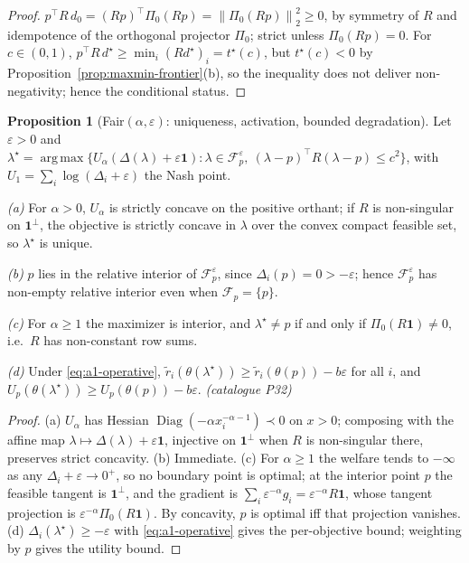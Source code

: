 \documentclass[12pt,a4paper]{report}
\newcommand{\1}{\mathbf{1}}
\newcommand{\norm}[1]{\left\lVert #1 \right\rVert}
\newcommand{\Floor}{\mathcal{F}_{p}}
\newcommand{\Pz}{\Pi_{0}}
\DeclareMathOperator*{\argmax}{arg\,max}
\DeclareMathOperator{\Diag}{Diag}
\theoremstyle{definition}
\newtheorem{proposition}[definition]{Proposition}
\begin{document}
\begin{proof}
\(p^\top R\,d_0=(Rp)^\top\Pz(Rp)=\norm{\Pz(Rp)}_2^2\ge0\), by symmetry of \(R\) and idempotence of the orthogonal projector \(\Pz\); strict unless \(\Pz(Rp)=0\). For \(c\in(0,1)\), \(p^\top R\,d^\star\ge\min_i(Rd^\star)_i=t^\star(c)\), but \(t^\star(c)<0\) by Proposition~\ref{prop:maxmin-frontier}(b), so the inequality does not deliver non-negativity; hence the conditional status.
\end{proof}

\begin{proposition}[Fair\((\alpha,\varepsilon)\): uniqueness, activation, bounded degradation]
\label{prop:fair}
Let \(\varepsilon>0\) and \(\lambda^\star=\argmax\{U_\alpha(\Delta(\lambda)+\varepsilon\1):\lambda\in\Floor^\varepsilon,\ (\lambda-p)^\top R(\lambda-p)\le c^2\}\), with \(U_1=\sum_i\log(\Delta_i+\varepsilon)\) the Nash point.

\emph{(a)} For \(\alpha>0\), \(U_\alpha\) is strictly concave on the positive orthant; if \(R\) is non-singular on \(\1^\perp\), the objective is strictly concave in \(\lambda\) over the convex compact feasible set, so \(\lambda^\star\) is unique.

\emph{(b)} \(p\) lies in the relative interior of \(\Floor^\varepsilon\), since \(\Delta_i(p)=0>-\varepsilon\); hence \(\Floor^\varepsilon\) has non-empty relative interior even when \(\Floor=\{p\}\).

\emph{(c)} For \(\alpha\ge1\) the maximizer is interior, and \(\lambda^\star\ne p\) if and only if \(\Pz(R\1)\ne0\), i.e.\ \(R\) has non-constant row sums.

\emph{(d)} Under \eqref{eq:a1-operative}, \(\tilde r_i(\theta(\lambda^\star))\ge\tilde r_i(\theta(p))-b\varepsilon\) for all \(i\), and \(U_p(\theta(\lambda^\star))\ge U_p(\theta(p))-b\varepsilon\). \emph{(catalogue P32)}
\end{proposition}

\begin{proof}
(a) \(U_\alpha\) has Hessian \(\Diag(-\alpha x_i^{-\alpha-1})\prec0\) on \(x>0\); composing with the affine map \(\lambda\mapsto\Delta(\lambda)+\varepsilon\1\), injective on \(\1^\perp\) when \(R\) is non-singular there, preserves strict concavity. (b) Immediate. (c) For \(\alpha\ge1\) the welfare tends to \(-\infty\) as any \(\Delta_i+\varepsilon\to0^+\), so no boundary point is optimal; at the interior point \(p\) the feasible tangent is \(\1^\perp\), and the gradient is \(\sum_i\varepsilon^{-\alpha}g_i=\varepsilon^{-\alpha}R\1\), whose tangent projection is \(\varepsilon^{-\alpha}\Pz(R\1)\). By concavity, \(p\) is optimal iff that projection vanishes. (d) \(\Delta_i(\lambda^\star)\ge-\varepsilon\) with \eqref{eq:a1-operative} gives the per-objective bound; weighting by \(p\) gives the utility bound.
\end{proof}
\end{document}
